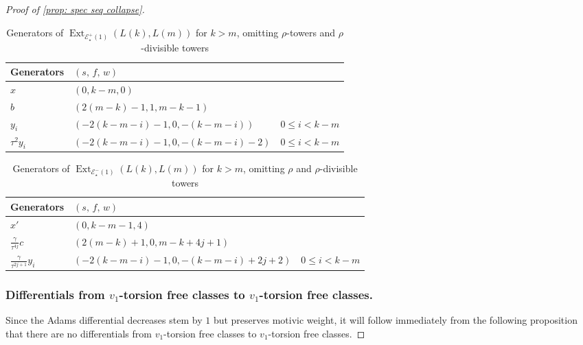 \documentclass{amsart}
\theoremstyle{plain}
\numberwithin{equation}{section}
\numberwithin{figure}{section}
\DeclareMathOperator{\Ext}{Ext}
\newcommand{\cE}{{\mathcal E}}
\newcommand{\0}{\langle 0 \rangle }
\begin{document}
\begin{proof}[Proof of \cref{prop: spec seq collapse}]
\begin{table}[h!] 
    \centering
    \begin{tabular}{l |l |l}
            Generators & $(s,\, f,\, w)$ & \\
            \hline
            $x$ & $(0, k-m, 0)$ &  \\
            $b$ & $(2(m-k)-1, 1, m-k-1)$ & \\
            \hline
            $y_{i}$ &{$\left(-2(k-m-i) -1, 0, -(k-m-i)\right)$} &{$0 \le i < k-m$} \\
            $\tau^{2}y_{i}$ & {$\left(-2(k-m-i) -1, 0, -(k-m-i)   - 2\right)$} & {$0 \le i < k-m$}\\
    \end{tabular}
    \caption{Generators of $\Ext_{\cE^{+}_{\star}(1)} (L(k), L(m))$ for $k > m$, omitting $\rho$-towers and $\rho$-divisible towers} 
    \label{tab:Extgens k>m pos}
\end{table}

\begin{table}[h!] 
    \centering
    \begin{tabular}{l |l |l}
            Generators & $(s,\, f,\, w)$ & \\
            \hline
            $x'$  & $(0, k-m-1, 4)$ & {}\\
            $\frac{\gamma}{\tau^{4j}}c$
            & $(2(m-k)+1, 0, m-k + 4j+ 1)$ 
            & {} \\
            \hline
            $\frac{\gamma}{\tau^{2j + 1}}y_{i}$ &{$\left(-2(k-m-i) -1, 0, -(k-m-i) + 2j + 2\right)$} &{$0 \le i < k-m$} \\
            
    \end{tabular}
    \caption{Generators of $\Ext_{\cE^{-}_{\star}(1)} (L(k), L(m))$ for $k > m$, omitting $\rho$ and $\rho$-divisible towers}
    \label{tab:Extgens k>m neg}
\end{table}

\subsubsection{Differentials from $v_{1}$-torsion free classes to $v_{1}$-torsion free classes.}
Since the Adams differential decreases stem by $1$ but preserves motivic weight, it will follow immediately from the following proposition that there are no differentials from $v_{1}$-torsion free classes to $v_{1}$-torsion free classes. 


\end{proof}
\end{document}
